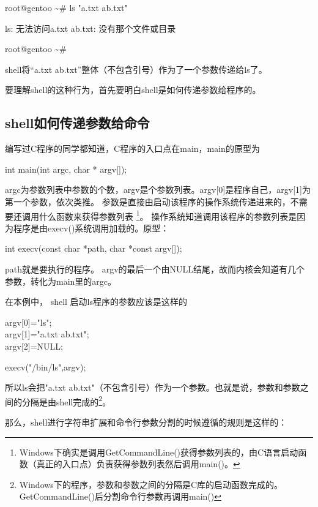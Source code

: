 \begin{code}
root@gentoo \textasciitilde \# ls "a.txt ab.txt" 

ls: 无法访问a.txt ab.txt: 没有那个文件或目录 

root@gentoo \textasciitilde \# 
\end{code}

shell将“a.txt ab.txt”整体（不包含引号）作为了一个参数传递给ls了。

要理解shell的这种行为，首先要明白shell是如何传递参数给程序的。

\begin{insertnote}
\subsection*{shell如何传递参数给命令}

编写过C程序的同学都知道，C程序的入口点在main，main的原型为

\begin{code}
int main(int argc, char * argv[]);
\end{code}

argc为参数列表中参数的个数，argv是个参数列表。argv[0]是程序自己，argv[1]为第一个参数，依次类推。
参数是直接由启动该程序的操作系统传递进来的，不需要还调用什么函数来获得参数列表
\footnote{Windows下确实是调用GetCommandLine()获得参数列表的，由C语言启动函数（真正的入口点）负责获得参数列表然后调用main()。}。
操作系统知道调用该程序的参数列表是因为程序是由execv()系统调用加载的。原型：
\begin{code}
int execv(const char *path, char *const argv[]);
\end{code}
path就是要执行的程序。
argv的最后一个由NULL结尾，故而内核会知道有几个参数，转化为main里的argc。

\end{insertnote}

在本例中，
shell
启动ls程序的参数应该是这样的
\begin{code}
argv[0]="ls";\\
argv[1]="a.txt ab.txt";\\
argv[2]=NULL;

execv("/bin/ls",argv);
\end{code}

所以ls会把"a.txt ab.txt"（不包含引号）作为一个参数。也就是说，参数和参数之间的分隔是由shell完成的\footnote{Windows下的程序，参数和参数之间的分隔是C库的启动函数完成的。GetCommandLine()后分割命令行参数再调用main()}。


那么，shell进行字符串扩展和命令行参数分割的时候遵循的规则是这样的：

